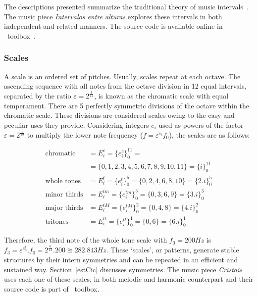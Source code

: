 The descriptions presented summarize the traditional theory of music intervals~\cite{Lacerda}. The music piece \emph{Intervalos entre alturas} explores these intervals in both independent and related manners. The source code is available online in \massa\ toolbox~\cite{MASSA}.

\subsubsection{Scales}\label{subsec:escalas}

A scale is an ordered set of pitches. Usually, scales repeat at each octave. The ascending sequence with all notes from the octave division in 12 equal intervals, separated by the ratio $\varepsilon=2^{\frac{1}{12}}$, is known as the chromatic scale with equal temperament. There are 5 perfectly symmetric divisions of the octave within the chromatic scale. These divisions are considered scales owing to the easy and peculiar uses they provide.
Considering integers $e_i$ used as powers of the factor $\varepsilon=2^{\frac{1}{12}}$
to multiply the lower note frequency ($f=\varepsilon^{e_i} f_0$),
the scales are as follows:

\begin{equation}\label{escSim}
\begin{split}
\text{chromatic}    & = E_i^c = \{e_i^c\}_0^{11} = \\
                    & =  \{0,1,2,3,4,5,6,7,8,9,10,11\} = \{i\}_0^{11}\\
\text{whole tones}  & = E_i^t = \{e_i^t\}_0^{5} = \{0,2,4,6,8,10\} = \{2.i\}_0^{5} \\
\text{minor thirds} & = E_i^{tm} = \{e_i^{tm}\}_0^{3} = \{0,3,6,9\} = \{3.i\}_0^3 \\
\text{major thirds} & = E_i^{tM} = \{e_i^{tM}\}_0^{2} = \{0,4,8\} = \{4.i\}_0^2\\
\text{tritones}     & = E_i^{tt} = \{e_i^{tt}\}_0^{1} = \{ 0, 6 \} = \{6.i\}_0^1
\end{split}
\end{equation}

Therefore, the third note of the whole tone scale with $f_0=200Hz$ is $f_3=\varepsilon^{e_3^t}. f_0 = 2^{\frac{6}{12}} . 200 \approxeq 282.843
Hz$. These `scales', or patterns, generate stable structures by their intern symmetries and can be repeated in an efficient and sustained way. Section~\ref{estCic} discusses symmetries. 
The music piece \emph{Cristais} uses each one of these scales, in both melodic and harmonic counterpart and their source code is part of \massa\ toolbox.


